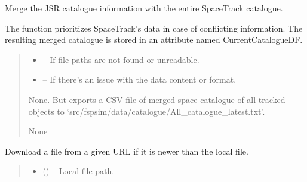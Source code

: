 \documentclass[letterpaper,10pt,english]{sphinxmanual}
\begin{document}
\begin{fulllineitems}
\begin{fulllineitems}
\label{\detokenize{fspsim.utils:fspsim.utils.SpaceCatalogue.SpaceCatalogue.CreateCatalogueAll}}
\pysigstartsignatures
{}
\pysigstopsignatures
\sphinxAtStartPar
Merge the JSR catalogue information with the entire SpaceTrack catalogue.

\sphinxAtStartPar
The function prioritizes SpaceTrack’s data in case of conflicting information.
The resulting merged catalogue is stored in an attribute named CurrentCatalogueDF.
\begin{quote}\begin{description}
\begin{itemize}
\item {} 
\sphinxAtStartPar
{} – If file paths are not found or unreadable.

\item {} 
\sphinxAtStartPar
{} – If there’s an issue with the data content or format.

\end{itemize}

\sphinxAtStartPar
None. But exports a CSV file of merged space catalogue of all tracked objects to ‘src/fspsim/data/catalogue/All\_catalogue\_latest.txt’.

\sphinxAtStartPar
None

\end{description}\end{quote}

\end{fulllineitems}


\begin{fulllineitems}
\label{\detokenize{fspsim.utils:fspsim.utils.SpaceCatalogue.SpaceCatalogue.DownloadJSRCatalogueIfNewer}}
\pysigstartsignatures
{}
\pysigstopsignatures
\sphinxAtStartPar
Download a file from a given URL if it is newer than the local file.
\begin{quote}\begin{description}
\begin{itemize}
\item {} 
\sphinxAtStartPar
{} () – Local file path.


\end{itemize}
\end{description}
\end{quote}
\end{fulllineitems}
\end{fulllineitems}
\end{document}
